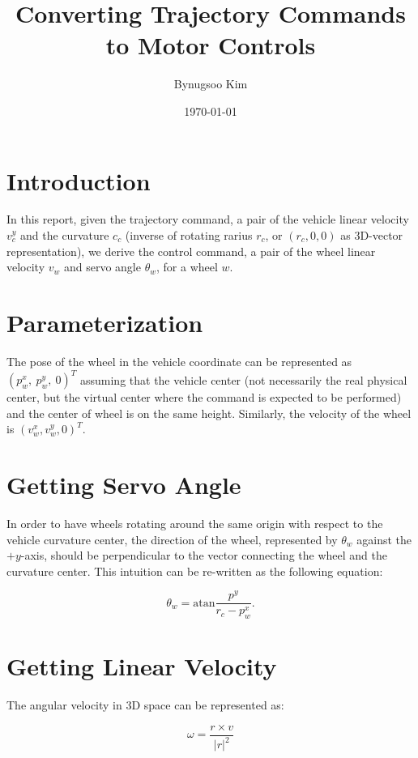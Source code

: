 \documentclass[a4paper]{article}
\title{Converting Trajectory Commands to Motor Controls}
\author{Bynugsoo Kim}
\date{\today}
\begin{document}
\maketitle

\section{Introduction}
\label{sec:introduction}
In this report, given the trajectory command, a pair of the vehicle linear velocity $v^y_c$ and the curvature $c_c$ (inverse of rotating rarius $r_c$, or $(r_c, 0, 0)$ as 3D-vector representation), we derive the control command, a pair of the wheel linear velocity $v_w$ and servo angle $\theta_w$, for a wheel $w$.

\section{Parameterization}
\label{sec:parameterization}
The pose of the wheel in the vehicle coordinate can be represented as $(p^x_w,~ p^y_w,~0)^T$ assuming that the vehicle center (not necessarily the real physical center, but the virtual center where the command is expected to be performed) and the center of wheel is on the same height. Similarly, the velocity of the wheel is $(v^x_w, v^y_w, 0)^T$.


\section{Getting Servo Angle}
\label{sec:servo_angle}
In order to have wheels rotating around the same origin with respect to the vehicle curvature center, the direction of the wheel, represented by $\theta_w$ against the $+y$-axis, should be perpendicular to the vector connecting the wheel and the curvature center. This intuition can be re-written as the following equation:

\begin{equation}
\theta_w = \text{atan}\frac{p^y}{r_c - p^x_w}.
\label{eq:servo_angle}
\end{equation}

\section{Getting Linear Velocity}
\label{sec:linear_velocity}

The angular velocity in 3D space can be represented as:

\begin{equation}
\omega = \frac{r \times v}{|r|^2}
\label{eq:angular_velocity}
\end{equation}
\end{document}
